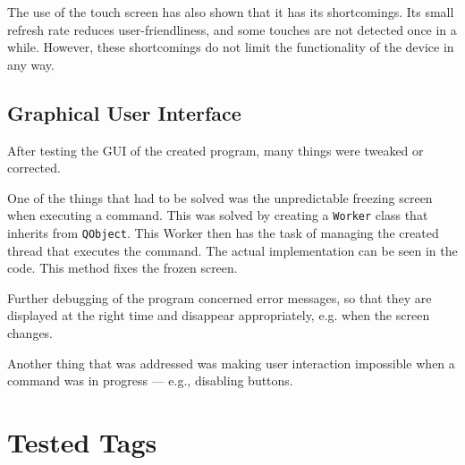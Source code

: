 The use of the touch screen has also shown that it has its shortcomings. Its small refresh rate reduces user-friendliness, and some touches are not detected once in a while. However, these shortcomings do not limit the functionality of the device in any way.

\subsection{Graphical User Interface}
After testing the GUI of the created program, many things were tweaked or corrected.

One of the things that had to be solved was the unpredictable freezing screen when executing a command. This was solved by creating a \texttt{Worker} class that inherits from \texttt{QObject}. This Worker then has the task of managing the created thread that executes the command. The actual implementation can be seen in the code. This method fixes the frozen screen.

Further debugging of the program concerned error messages, so that they are displayed at the right time and disappear appropriately, e.g. when the screen changes.

Another thing that was addressed was making user interaction impossible when a command was in progress --- e.g., disabling buttons.


\section{Tested Tags}
\label{sec:testedtags}

